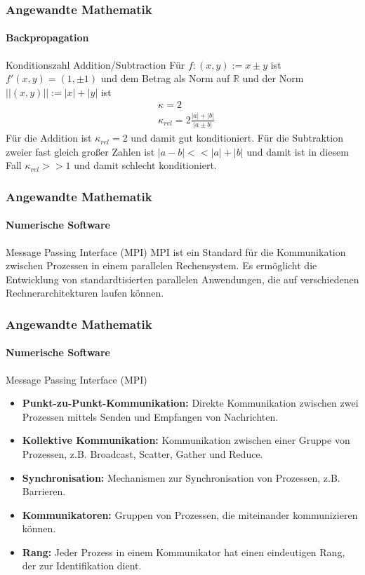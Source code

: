 \documentclass{beamer}
\begin{document}
\begin{frame}
    \frametitle{Angewandte Mathematik}
\framesubtitle{Backpropagation}
    \begin{block}{Konditionszahl Addition/Subtraction}
Für $f:(x,y):= x \pm y$ ist $f'(x,y) = (1,\pm 1)$ und dem Betrag als Norm auf $\mathbb{R}$  und der Norm $||(x,y)|| := |x| + |y|$ ist 
\begin{align*}
& \kappa = 2 \\
& \kappa_{rel} = 2\frac{|a| + |b| }{|a \pm b|}
\end{align*}
Für die Addition ist  $\kappa_{rel} = 2$ und damit gut konditioniert.
Für die Subtraktion zweier fast gleich großer Zahlen ist $|a - b| << |a| + |b|$ und damit ist in diesem Fall $\kappa_{rel} >> 1$ und damit schlecht konditioniert. 
\end{block}
 \end{frame}




 \begin{frame}
    \frametitle{Angewandte Mathematik}
    \framesubtitle{Numerische Software}
    \begin{block}{Message Passing Interface (MPI)}
          MPI ist ein Standard für die Kommunikation zwischen Prozessen in einem parallelen Rechensystem.
          Es ermöglicht die Entwicklung von standardtisierten parallelen Anwendungen, die auf verschiedenen Rechnerarchitekturen laufen können.
    \end{block}
\end{frame}



\begin{frame}
    \frametitle{Angewandte Mathematik}
    \framesubtitle{Numerische Software}
    \begin{block}{Message Passing Interface (MPI)}
            \begin{itemize}
                \item \textbf{Punkt-zu-Punkt-Kommunikation:} Direkte Kommunikation zwischen zwei Prozessen mittels Senden und Empfangen von Nachrichten.
                \item \textbf{Kollektive Kommunikation:} Kommunikation zwischen einer Gruppe von Prozessen, z.B. Broadcast, Scatter, Gather und Reduce.
                \item \textbf{Synchronisation:} Mechanismen zur Synchronisation von Prozessen, z.B. Barrieren.
                \item \textbf{Kommunikatoren:} Gruppen von Prozessen, die miteinander kommunizieren können.
                \item \textbf{Rang:} Jeder Prozess in einem Kommunikator hat einen eindeutigen Rang, der zur Identifikation dient.
            \end{itemize}
    \end{block}
\end{frame}
\end{document}
